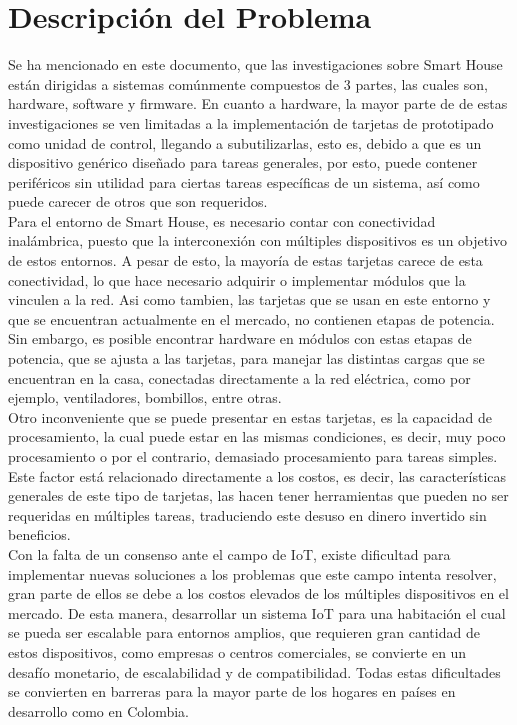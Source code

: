 \chapter{Descripción del Problema}

Se ha mencionado en este documento, que las investigaciones sobre Smart House están dirigidas a sistemas comúnmente compuestos de 3 partes, las cuales son, hardware, software y firmware. En cuanto a hardware, la mayor parte de de estas investigaciones se ven limitadas a la implementación de tarjetas de prototipado como unidad de control, llegando a subutilizarlas, esto es, debido a que es un dispositivo genérico diseñado para tareas generales, por esto, puede contener periféricos sin utilidad para ciertas tareas específicas de un sistema, así como puede carecer de otros que son requeridos.\\

Para el entorno de Smart House, es necesario contar con conectividad inalámbrica, puesto que la interconexión con múltiples dispositivos es un objetivo de estos entornos. A pesar de esto, la mayoría de estas tarjetas carece de esta conectividad, lo que hace necesario adquirir o implementar módulos que la vinculen a la red. Asi como tambien, las tarjetas que se usan en este entorno y que se encuentran actualmente en el mercado, no contienen etapas de potencia. Sin embargo, es posible encontrar hardware en módulos con estas etapas de potencia, que se ajusta a las tarjetas, para manejar las distintas cargas que se encuentran en la casa, conectadas directamente a la red eléctrica, como por ejemplo, ventiladores, bombillos, entre otras.\\

Otro inconveniente que se puede presentar en estas tarjetas, es la capacidad de procesamiento, la cual puede estar en las mismas condiciones, es decir, muy poco procesamiento o por el contrario, demasiado procesamiento para tareas simples. Este factor está relacionado directamente a los costos, es decir, las características generales de este tipo de tarjetas, las hacen tener herramientas que pueden no ser requeridas en múltiples tareas, traduciendo este desuso en dinero invertido sin beneficios.\\

Con la falta de un consenso ante el campo de IoT, existe dificultad para implementar nuevas soluciones a los problemas que este campo intenta resolver, gran parte de ellos se debe a los costos elevados de los múltiples dispositivos en el mercado. De esta manera, desarrollar un sistema IoT para una habitación el cual se pueda ser escalable para entornos amplios, que requieren gran cantidad de estos dispositivos, como empresas o centros comerciales, se convierte en un desafío monetario, de escalabilidad y de compatibilidad. Todas estas dificultades se convierten en barreras para la mayor parte de los hogares en países en desarrollo como en Colombia.\\

